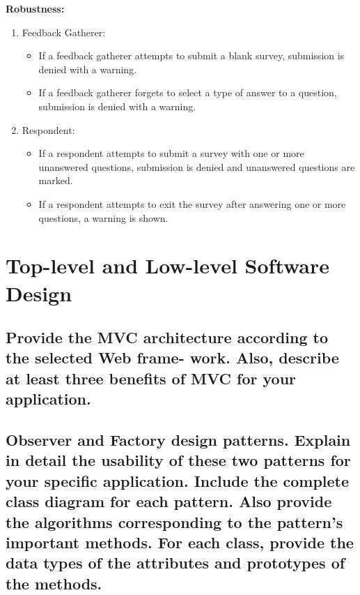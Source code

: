 \documentclass[letterpaper, 12 pt, conference]{ieeeconf}
\begin{document}
\hfill \break

\textbf{Robustness:}
\begin{enumerate}
    \item[] Feedback Gatherer:
    \begin{itemize}
        \item  If a feedback gatherer attempts to submit a blank survey, submission is denied with a warning.
        \item If a feedback gatherer forgets to select a type of answer to a question, submission is denied with a warning.
    \end{itemize}
    \item[] Respondent:
    \begin{itemize}
        \item If a respondent attempts to submit a survey with one or more unanswered questions, submission is denied and unanswered questions are marked.
        \item If a respondent attempts to exit the survey after answering one or more questions, a warning is shown.
    \end{itemize}
\end{enumerate}


\section{Top-level and Low-level Software Design}
\subsection{Provide the MVC architecture according to the selected Web frame- work. Also, describe at least three benefits of MVC for your application.}
\linebreak
    \hfill \break
    
\subsection{Observer and Factory design patterns. Explain in detail the usability of these two patterns for your specific application. Include the complete class diagram for each pattern. Also provide the algorithms corresponding to the pattern’s important methods. For each class, provide the data types of the attributes and prototypes of the methods.}
\linebreak
    \hfill \break
    
\end{document}
